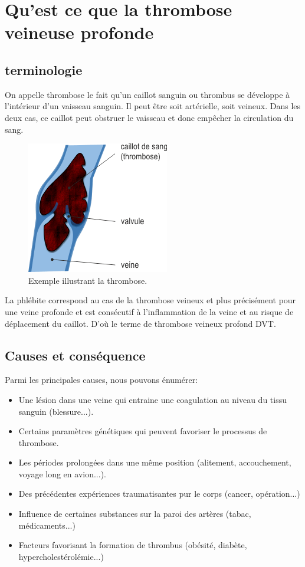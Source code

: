 \chapter{Qu'est ce que la thrombose veineuse profonde}

\section{terminologie}

On appelle thrombose le fait qu'un caillot sanguin ou thrombus se développe à l'intérieur d'un vaisseau sanguin. Il peut être soit artérielle, soit veineux. Dans les deux cas, ce caillot peut obstruer le vaisseau et donc empêcher la circulation du sang.

\begin{figure}[H]
\centering
    \includegraphics[scale=2,angle=0]{Images/phleb1.png}
    \caption{Exemple illustrant la thrombose.}
    \label{fig:phleb1}
\end{figure}

La phlébite correspond au cas de la thrombose veineux et plus précisément pour une veine profonde et est consécutif à l'inflammation de la veine et au risque de déplacement du caillot. D'où le terme de thrombose veineux profond DVT.

\section{Causes et conséquence}

Parmi les principales causes, nous pouvons énumérer:


\begin{itemize}
\item Une lésion dans une veine qui entraine une coagulation au niveau du tissu sanguin (blessure...).
\item Certains paramètres génétiques qui peuvent favoriser le processus de thrombose.
\item Les périodes prolongées dans une même position (alitement, accouchement, voyage long en avion...).
\item Des précédentes expériences traumatisantes pur le corps (cancer, opération...)
\item Influence de certaines substances sur la paroi des artères (tabac, médicaments...) 
\item Facteurs favorisant la formation de thrombus (obésité, diabète, hypercholestérolémie...) 
\end{itemize}

